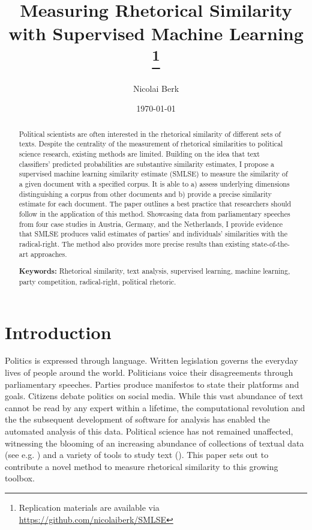 \documentclass{article}
\title{Measuring Rhetorical Similarity with Supervised Machine Learning
\footnote{Replication materials are available via \href{https://github.com/nicolaiberk/SMLSE}{https://github.com/nicolaiberk/SMLSE}}
}
\author{Nicolai Berk}
\date{\today}
\begin{document}



\maketitle

\begin{abstract}
Political scientists are often interested in the rhetorical similarity of different sets of texts. Despite the centrality of the measurement of rhetorical similarities to political science research, existing methods are limited. Building on the idea that text classifiers' predicted probabilities are substantive similarity estimates, I propose a supervised machine learning similarity estimate (SMLSE) to measure the similarity of a given document with a specified corpus. It is able to a) assess underlying dimensions distinguishing a corpus from other documents and b) provide a precise similarity estimate for each document. The paper outlines a best practice that researchers should follow in the application of this method. Showcasing data from parliamentary speeches from four case studies in Austria, Germany, and the Netherlands, I provide evidence that SMLSE produces valid estimates of parties' and individuals' similarities with the radical-right. The method also provides more precise results than existing state-of-the-art approaches.\par \medskip

\textbf{Keywords:} Rhetorical similarity, text analysis, supervised learning, machine learning, party competition, radical-right, political rhetoric.
\end{abstract}



\section{Introduction}
\label{sec:Intro}
Politics is expressed through language. Written legislation governs the everyday lives of people around the world. Politicians voice their disagreements through parliamentary speeches. Parties produce manifestos to state their platforms and goals. Citizens debate politics on social media. While this vast abundance of text cannot be read by any expert within a lifetime, the computational revolution and the the subsequent development of software for analysis has enabled the automated analysis of this data. Political science has not remained unaffected, witnessing the blooming of an increasing abundance of collections of textual data (see e.g. \cite{Rauh2020, Schumacher2016, Schumacher2019}) and a variety of tools to study text (\cite{Boumans2016, Grimmer2013TextASData}). This paper sets out to contribute a novel method to measure rhetorical similarity to this growing toolbox.\par
\end{document}
